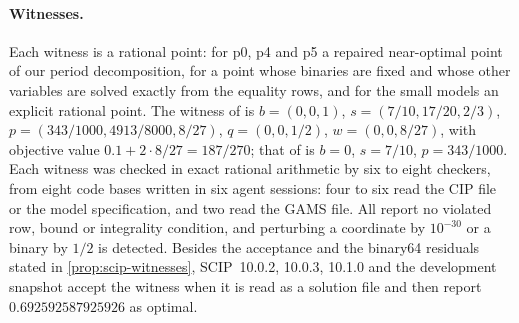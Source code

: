 \paragraph{Witnesses.}
Each witness is a rational point: for p0, p4 and p5 a repaired near-optimal point of our period decomposition, for  a point whose binaries are fixed and whose other variables are solved exactly from the equality rows, and for the small models an explicit rational point.
The witness of  is $b=(0,0,1)$, $s=(7/10,17/20,2/3)$, $p=(343/1000,4913/8000,8/27)$, $q=(0,0,1/2)$, $w=(0,0,8/27)$, with objective value $0.1+2\cdot8/27=187/270$; that of  is $b=0$, $s=7/10$, $p=343/1000$.
Each witness was checked in exact rational arithmetic by six to eight checkers, from eight code bases written in six agent sessions: four to six read the CIP file or the model specification, and two read the GAMS file. All report no violated row, bound or integrality condition, and perturbing a coordinate by $10^{-30}$ or a binary by $1/2$ is detected.
Besides the acceptance and the binary64 residuals stated in \cref{prop:scip-witnesses}, SCIP~10.0.2, 10.0.3, 10.1.0 and the development snapshot accept the  witness when it is read as a solution file and then report $0.692592587925926$ as optimal.

\begin{certbox}
\end{certbox}


